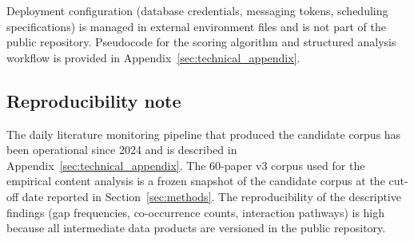 Deployment configuration (database credentials, messaging tokens,
scheduling specifications) is managed in external environment files
and is not part of the public repository. Pseudocode for the scoring
algorithm and structured analysis workflow is provided in
Appendix~\ref{sec:technical_appendix}.

\subsection*{Reproducibility note}

The daily literature monitoring pipeline that produced the candidate
corpus has been operational since 2024 and is described in
Appendix~\ref{sec:technical_appendix}. The 60-paper v3 corpus used
for the empirical content analysis is a frozen snapshot of the
candidate corpus at the cut-off date reported in
Section~\ref{sec:methods}. The reproducibility of the descriptive
findings (gap frequencies, co-occurrence counts, interaction
pathways) is high because all intermediate data products are
versioned in the public repository.